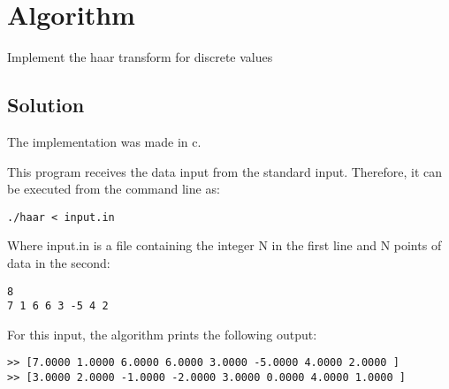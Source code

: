 \section*{Algorithm}

Implement the haar transform for discrete values

\subsection*{Solution}

The implementation was made in c.


This program receives the data input from the standard input. Therefore, it can
be executed from the command line as:

\begin{verbatim}
./haar < input.in
\end{verbatim}

Where input.in is a file containing the integer N in the first line
and N points of data in the second:

\begin{verbatim}
8
7 1 6 6 3 -5 4 2
\end{verbatim}

For this input, the algorithm prints the following output:

\begin{verbatim}
>> [7.0000 1.0000 6.0000 6.0000 3.0000 -5.0000 4.0000 2.0000 ]
>> [3.0000 2.0000 -1.0000 -2.0000 3.0000 0.0000 4.0000 1.0000 ]
\end{verbatim}
